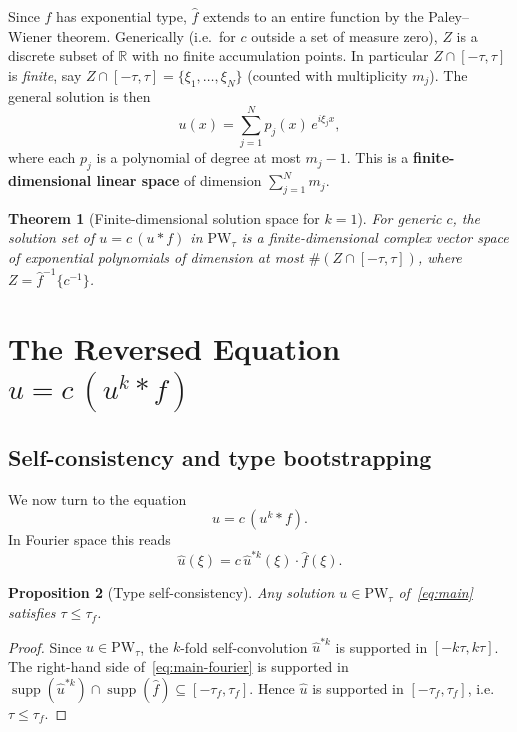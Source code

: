 \documentclass[12pt]{article}
\newtheorem{theorem}{Theorem}[section]
\newtheorem{proposition}[theorem]{Proposition}
\DeclareMathOperator{\supp}{supp}
\newcommand{\R}{\mathbb{R}}
\newcommand{\PW}{\mathrm{PW}}
\newcommand{\wh}{\widehat}
\begin{document}
Since $f$ has exponential type, $\wh{f}$ extends to an entire function
by the Paley--Wiener theorem.
Generically (i.e.\ for $c$ outside a set of measure zero), $Z$ is a discrete
subset of $\R$ with no finite accumulation points.
In particular $Z\cap[-\tau,\tau]$ is \emph{finite}, say
$Z\cap[-\tau,\tau] = \{\xi_1,\ldots,\xi_N\}$ (counted with multiplicity $m_j$).
The general solution is then
\[
  u(x) = \sum_{j=1}^{N} p_j(x)\,e^{i\xi_j x},
\]
where each $p_j$ is a polynomial of degree at most $m_j - 1$.
This is a \textbf{finite-dimensional linear space} of dimension
$\sum_{j=1}^N m_j$.

\begin{theorem}[Finite-dimensional solution space for $k=1$]
  \label{thm:k1-linear}
  For generic $c$, the solution set of $u = c\,(u\ast f)$ in $\PW_\tau$ is a
  finite-dimensional complex vector space of exponential polynomials of
  dimension at most $\#(Z\cap[-\tau,\tau])$, where
  $Z = \wh{f}^{-1}\{c^{-1}\}$.
\end{theorem}

\section{The Reversed Equation \texorpdfstring{$u = c\,(u^k \ast f)$}{u = c(uk*f)}}

\subsection{Self-consistency and type bootstrapping}

We now turn to the equation
\begin{equation}
  \label{eq:main}
  u = c\,(u^k \ast f).
\end{equation}
In Fourier space this reads
\begin{equation}
  \label{eq:main-fourier}
  \wh{u}(\xi) = c\,\wh{u}^{\ast k}(\xi)\cdot\wh{f}(\xi).
\end{equation}

\begin{proposition}[Type self-consistency]
  Any solution $u \in \PW_\tau$ of~\eqref{eq:main} satisfies
  $\tau \leq \tau_f$.
\end{proposition}

\begin{proof}
  Since $u \in \PW_\tau$, the $k$-fold self-convolution $\wh{u}^{\ast k}$ is
  supported in $[-k\tau, k\tau]$.
  The right-hand side of~\eqref{eq:main-fourier} is supported in
  $\supp(\wh{u}^{\ast k})\cap\supp(\wh{f})\subseteq [-\tau_f, \tau_f]$.
  Hence $\wh{u}$ is supported in $[-\tau_f, \tau_f]$, i.e.\ $\tau \leq \tau_f$.
\end{proof}
\end{document}

